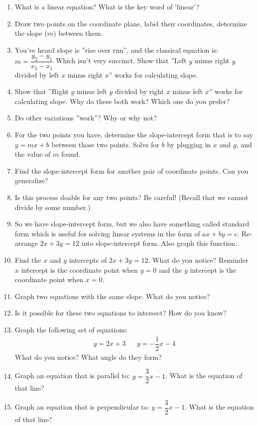 \documentclass[12pt,letterpaper]{article}
\begin{document}
\begin{enumerate}
    \item What is a linear equation? What is the key word of 'linear'?
    \item Draw two points on the coordinate plane, label their coordinates, determine the slope ($m$) between them.
    \item You've heard slope is ''rise over run'', and the classical equation is: $m=\dfrac{y_2-y_1}{x_2-x_1}$ Which isn't very succinct. Show that ''Left $y$ minus right $y$ divided by left $x$ minus right $x$'' works for calculating slope.
    \item Show that ''Right $y$ minus left $y$ divided by right $x$ minus left $x$'' works for calculating slope. Why do these both work? Which one do you prefer?
    \item Do other variations ''work''? Why or why not?
    \item For the two points you have, determine the slope-intercept form that is to say $y=mx+b$ between those two points. Solve for $b$ by plugging in $x$ and $y$, and the value of $m$ found.
    \item Find the slope-intercept form for another pair of coordinate points. Can you generalize?
    \item Is this process doable for any two points? Be careful! (Recall that we cannot divide by some number.)
    \item So we have slope-intercept form, but we also have something called standard form which is useful for solving linear systems in the form of $ax+by=c$. Re-arrange $2x+3y=12$ into slope-intercept form. Also graph this function.
    \item Find the $x$ and $y$ intercepts of $2x+3y=12$. What do you notice? Reminder $x$ intercept is the coordinate point when $y=0$ and the $y$ intercept is the coordinate point when $x=0$.
    \item Graph two equations with the same slope. What do you notice?
    \item Is it possible for these two equations to intersect? How do you know?
    \item Graph the following set of equations:
          \begin{align*}
              y=2x+3 &  & y=-\dfrac{1}{2}x-4
          \end{align*}
          What do you notice? What angle do they form?
    \item Graph an equation that is parallel to: $y=\dfrac{3}{2}x-1$. What is the equation of that line?
    \item Graph an equation that is perpendicular to: $y=\dfrac{3}{2}x-1$. What is the equation of that line?
\end{enumerate}
\end{document}
